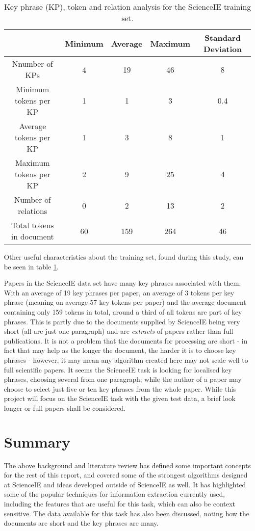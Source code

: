 \begin{table}
	\centering
	\caption[ScienceIE Training Set Analysis]{Key phrase (KP), token and relation analysis for the ScienceIE training set.}
	\begin{tabular}{ c | c c c c }
		& \textbf{Minimum} & \textbf{Average} & \textbf{Maximum} & \textbf{Standard Deviation} \\
		\hline
		Nnumber of KPs & 4 & 19 & 46 & 8 \\
		Minimum tokens per KP & 1 & 1 & 3 & 0.4 \\
		Average tokens per KP & 1 & 3 & 8 & 1 \\
		Maximum tokens per KP & 2 & 9 & 25 & 4 \\
		Number of relations & 0 & 2 & 13 & 2 \\
		Total tokens in document & 60 & 159 & 264 & 46
	\end{tabular}
	\label{table:traininganalysis}
\end{table}

Other useful characteristics about the training set, found during this study, can be seen in table \ref{table:traininganalysis}.

Papers in the ScienceIE data set have many key phrases associated with them. With an average of 19 key phrases per paper, an average of 3 tokens per key phrase (meaning on average 57 key tokens per paper) and the average document containing only 159 tokens in total, around a third of all tokens are part of key phrases. This is partly due to the documents supplied by ScienceIE being very short (all are just one paragraph) and are \textit{extracts} of papers rather than full publications. It is not a problem that the documents for processing are short - in fact that may help as the longer the document, the harder it is to choose key phrases \cite{Hasan2014} - however, it may mean any algorithm created here may not scale well to full scientific papers. It seems the ScienceIE task is looking for localised key phrases, choosing several from one paragraph; while the author of a paper may choose to select just five or ten key phrases from the whole paper. While this project will focus on the ScienceIE task with the given test data, a brief look longer or full papers shall be considered.

\section{Summary}
The above background and literature review has defined some important concepts for the rest of this report, and covered some of the strongest algorithms designed at ScienceIE and ideas developed outside of ScienceIE as well. It has highlighted some of the popular techniques for information extraction currently used, including the features that are useful for this task, which can also be context sensitive. The data available for this task has also been discussed, noting how the documents are short and the key phrases are many.

